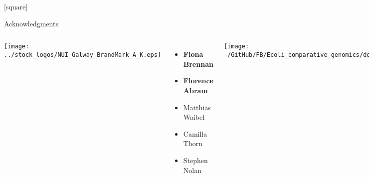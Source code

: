 \documentclass[10pt, compress]{beamer}
\begin{document}
\begin{frame}
%

\end{frame}

[square]
\begin{frame}{Acknowledgments}
  \begin{columns}[onlytextwidth]
    \texttt{[image: ../stock\_logos/NUI\_Galway\_BrandMark\_A\_K.eps]}\\
      \begin{itemize}
        \item \textbf{Fiona Brennan}
        \item \textbf{Florence Abram}
        \item Matthias Waibel
        \item Camilla Thorn
        \item Stephen Nolan
        \end{itemize}
        \vfill

    \texttt{[image: ~/GitHub/FB/Ecoli\_comparative\_genomics/doc/presentations/MyNUIG(mnuigtheme)/frequentFigs/jhi\_dark.png]}\\
      \begin{itemize}
      \item \textbf{Leighton Pritchard}
        \item \textbf{Ashleigh Holmnes}
        \end{itemize}
        \vskip 1.2cm
        \alert<2>{}
  \end{columns}
\end{frame}



\end{document}
